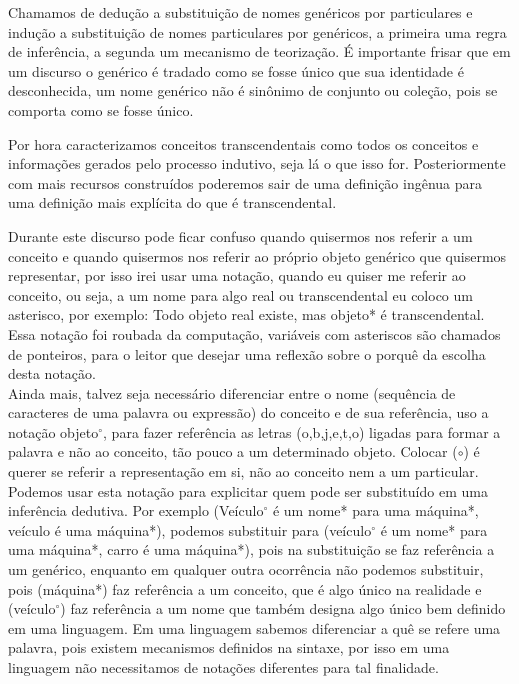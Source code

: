 \documentclass[10pt,a4paper]{report}
\begin{document}
Chamamos de dedução a substituição de nomes genéricos por particulares e indução a substituição de nomes particulares por genéricos, a primeira uma regra de inferência, a segunda um mecanismo de teorização. É importante frisar que em um discurso o genérico é tradado como se fosse único que sua identidade é desconhecida, um nome genérico não é sinônimo de conjunto ou coleção, pois se comporta como se fosse único.

\hspace{\baselineskip}

Por hora caracterizamos conceitos transcendentais como todos os conceitos e informações gerados pelo processo indutivo, seja lá o que isso for. Posteriormente com mais recursos construídos poderemos sair de uma definição ingênua para uma definição mais explícita do que é transcendental.


\hspace{\baselineskip} 

Durante este discurso pode ficar confuso quando quisermos nos referir a um conceito e quando quisermos nos referir ao próprio objeto genérico que quisermos representar, por isso irei usar uma notação, quando eu quiser me referir ao conceito, ou seja, a um nome para algo real ou transcendental eu coloco um asterisco, por exemplo: Todo objeto real existe, mas objeto* é transcendental. Essa notação foi roubada da computação, variáveis com asteriscos são chamados de ponteiros, para o leitor que desejar uma reflexão sobre o porquê da escolha desta notação. \\

Ainda mais, talvez seja necessário diferenciar entre o nome (sequência de caracteres de uma palavra ou expressão) do conceito e de sua referência, uso a notação objeto$^\circ$, para fazer referência as letras (o,b,j,e,t,o) ligadas para formar a palavra e não ao conceito, tão pouco a um determinado objeto. Colocar ($\circ$) é querer se referir a representação em si, não ao conceito nem a um particular.\\

% 
Podemos usar esta notação para explicitar quem pode ser substituído em uma inferência dedutiva. Por exemplo (Veículo$^\circ$ é um nome* para uma máquina*, veículo é uma máquina*), podemos substituir para (veículo$^\circ$ é um nome* para uma máquina*, carro é uma máquina*), pois na substituição se faz referência a um genérico, enquanto em qualquer outra ocorrência não podemos substituir, pois (máquina*) faz referência a um conceito, que é algo único na realidade e (veículo$^\circ$) faz referência a um nome que também designa algo único bem definido em uma linguagem. Em uma linguagem sabemos diferenciar a quê se refere uma palavra, pois existem mecanismos definidos na sintaxe, por isso em uma linguagem não necessitamos de notações diferentes para tal finalidade.
\end{document}
